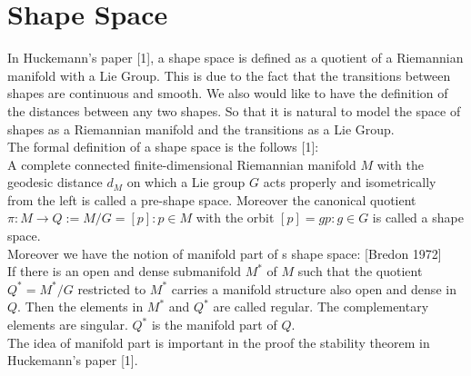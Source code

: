 \documentclass[12pt]{article}
\theoremstyle{definition}
\theoremstyle{remark}
\numberwithin{equation}{section}
\begin{document}
\section{Shape Space}
In Huckemann's paper [1], a shape space is defined as a quotient of a Riemannian manifold with a Lie Group. This is due to the fact that the transitions between shapes are continuous and smooth. We also would like to have the definition of the distances between any two shapes. So that it is natural to model the space of shapes as a Riemannian manifold and the transitions as a Lie Group. \\[0.2cm]
\indent The formal definition of a shape space is the follows [1]:\\[0.2cm]
\indent A complete connected finite-dimensional Riemannian manifold $M$ with the geodesic distance $d_M$ on which a Lie group $G$ acts properly and isometrically from the left is called a pre-shape space. Moreover the canonical quotient $\pi: M \rightarrow Q := M / G = {[p]: p\in M}$ with the orbit $[p] = {gp: g \in G}$ is called a shape space.\\[0.2cm]
\indent Moreover we have the notion of manifold part of s shape space: [Bredon 1972] \\[0.2cm]
\indent If there is an open and dense submanifold $M^\ast$ of $M$ such that the quotient $Q^\ast=M^\ast / G$ restricted to $M^\ast$ carries a manifold structure also open and dense in $Q$. Then the elements in $M^\ast$ and $Q^\ast$ are called regular. The complementary elements are singular. $Q^\ast$ is the manifold part of $Q$.\\[0.2cm]
\indent The idea of manifold part is important in the proof the stability theorem in Huckemann's paper [1].
\end{document}
